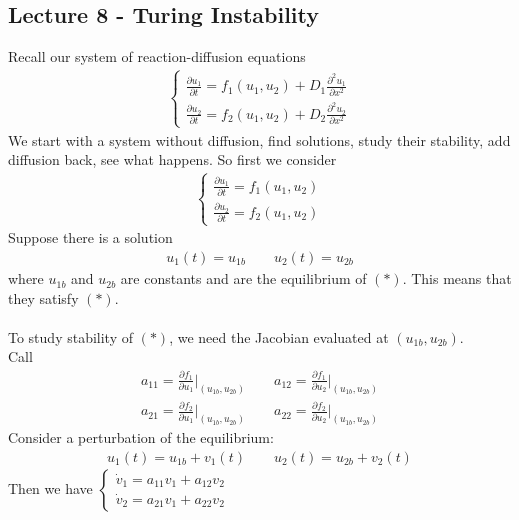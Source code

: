 \documentclass[12pt, letterpaper]{article}
\begin{document}
\subsection{Lecture 8 - Turing Instability}
Recall our system of reaction-diffusion equations
\begin{align*}
    \begin{cases}
        \displaystyle\frac{\partial u_1}{\partial t} = f_1(u_1,u_2) + D_1 \frac{\partial^2 u_1}{\partial x^2} \\
        \displaystyle\frac{\partial u_2}{\partial t} = f_2(u_1,u_2) + D_2 \frac{\partial^2 u_2}{\partial x^2}
    \end{cases}
\end{align*}
We start with a system without diffusion, find solutions, study their stability, add diffusion back,
see what happens. So first we consider
\begin{align*}
    \begin{cases}
        \displaystyle\frac{\partial u_1}{\partial t} = f_1(u_1,u_2) \\
        \displaystyle\frac{\partial u_2}{\partial t} = f_2(u_1,u_2)
    \end{cases} \tag{$\ast$}
\end{align*}
Suppose there is a solution
\begin{align*}
    u_1(t) = u_{1b} \qquad u_2(t) = u_{2b}
\end{align*}
where $u_{1b}$ and $u_{2b}$ are constants and are the equilibrium of $(\ast)$. This means that 
they satisfy $(\ast)$. \\ \\
To study stability of $(\ast)$, we need the Jacobian evaluated at $(u_{1b},u_{2b})$. \\ 
Call 
\begin{align*}
    a_{11} = \frac{\partial f_1}{\partial u_1} \Big|_{(u_{1b},u_{2b})} \qquad a_{12} = \frac{\partial f_1}{\partial u_2} \Big|_{(u_{1b},u_{2b})} \\
    a_{21} = \frac{\partial f_2}{\partial u_1} \Big|_{(u_{1b},u_{2b})} \qquad a_{22} = \frac{\partial f_2}{\partial u_2} \Big|_{(u_{1b},u_{2b})}
\end{align*}
Consider a perturbation of the equilibrium:
\begin{align*}
    u_1(t) = u_{1b} + v_1(t) \qquad u_2(t) = u_{2b} + v_2(t)
\end{align*}
Then we have $\begin{cases}
    \dot v_1 = a_{11} v_1 + a_{12}v_2 \\
    \dot v_2 = a_{21} v_1 + a_{22}v_2
\end{cases}$ \\ \\
\end{document}
